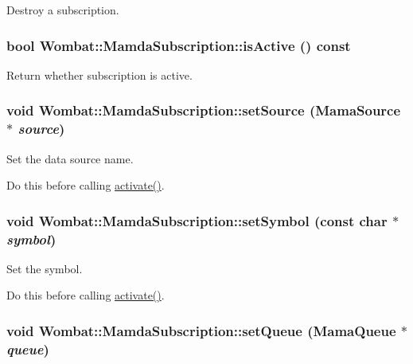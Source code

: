 Destroy a subscription. 

\hypertarget{classWombat_1_1MamdaSubscription_43b96fd23c3f478ad28269152177c78d}{
\subsubsection[isActive]{\setlength{\rightskip}{0pt plus 5cm}bool Wombat::Mamda\-Subscription::is\-Active () const}}
\label{classWombat_1_1MamdaSubscription_43b96fd23c3f478ad28269152177c78d}


Return whether subscription is active. 

\hypertarget{classWombat_1_1MamdaSubscription_4661e2eed184f9e0be3eaf19e03d80a3}{
\subsubsection[setSource]{\setlength{\rightskip}{0pt plus 5cm}void Wombat::Mamda\-Subscription::set\-Source (Mama\-Source $\ast$ {\em source})}}
\label{classWombat_1_1MamdaSubscription_4661e2eed184f9e0be3eaf19e03d80a3}


Set the data source name. 

Do this before calling \hyperlink{classWombat_1_1MamdaSubscription_50f691571f680c77ad949f5c162afe35}{activate()}. \hypertarget{classWombat_1_1MamdaSubscription_b31e9fce3fd77f2e446126c1254b73f3}{
\subsubsection[setSymbol]{\setlength{\rightskip}{0pt plus 5cm}void Wombat::Mamda\-Subscription::set\-Symbol (const char $\ast$ {\em symbol})}}
\label{classWombat_1_1MamdaSubscription_b31e9fce3fd77f2e446126c1254b73f3}


Set the symbol. 

Do this before calling \hyperlink{classWombat_1_1MamdaSubscription_50f691571f680c77ad949f5c162afe35}{activate()}. \hypertarget{classWombat_1_1MamdaSubscription_917a279a093c277d540b3db0014187a2}{
\subsubsection[setQueue]{\setlength{\rightskip}{0pt plus 5cm}void Wombat::Mamda\-Subscription::set\-Queue (Mama\-Queue $\ast$ {\em queue})}}
\label{classWombat_1_1MamdaSubscription_917a279a093c277d540b3db0014187a2}


